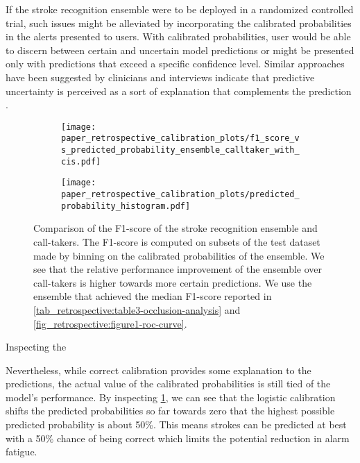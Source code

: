 If the stroke recognition ensemble were to be deployed in a randomized controlled trial, such issues might be alleviated by incorporating the calibrated probabilities in the alerts presented to users. With calibrated probabilities, user would be able to discern between certain and uncertain model predictions or might be presented only with predictions that exceed a specific confidence level. Similar approaches have been suggested by clinicians and interviews indicate that predictive uncertainty is perceived as a sort of explanation that complements the prediction \cite{tonekaboni_what_2019}.


\begin{figure}
    \begin{subfigure}[c]{0.48\columnwidth}
        \centering
        \texttt{[image: paper\_retrospective\_calibration\_plots/f1\_score\_vs\_predicted\_probability\_ensemble\_calltaker\_with\_cis.pdf]}
    \end{subfigure}    
    \begin{subfigure}[c]{0.48\columnwidth}
        \centering
        \texttt{[image: paper\_retrospective\_calibration\_plots/predicted\_probability\_histogram.pdf]}
    \end{subfigure}    
    \caption[Comparison of F1-score of stroke recognition ensemble and call-takers as function of predicted probability.]{ Comparison of the F1-score of the stroke recognition ensemble and call-takers. The F1-score is computed on subsets of the test dataset made by binning on the calibrated probabilities of the ensemble. We see that the relative performance improvement of the ensemble over call-takers is higher towards more certain predictions. We use the ensemble that achieved the median F1-score reported in \cref{tab_retrospective:table3-occlusion-analysis} and \cref{fig_retrospective:figure1-roc-curve}.}
    \label{fig_discussion:retrospective-paper-calibration-curve-sigmoid-isotonic}
\end{figure}    

Inspecting the 


Nevertheless, while correct calibration provides some explanation to the predictions, the actual value of the calibrated probabilities is still tied of the model's performance. By inspecting \cref{fig_discussion:retrospective-paper-calibration-curve-sigmoid-isotonic}, we can see that the logistic calibration shifts the predicted probabilities so far towards zero that the highest possible predicted probability is about 50\%. This means strokes can be predicted at best with a 50\% chance of being correct which limits the potential reduction in alarm fatigue. 

